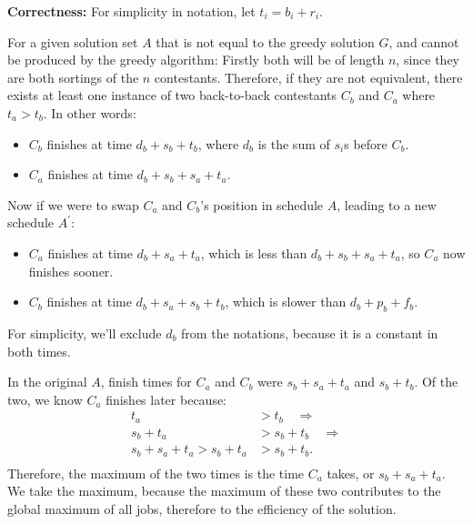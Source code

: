 \documentclass[12pt, letterpaper]{article}
\begin{document}
\noindent\textbf{Correctness:}
For simplicity in notation, let $t_i = b_i + r_i$.

\noindent For a given solution set $A$ that is not equal to the greedy solution $G$, and cannot be produced by the greedy algorithm:
Firstly both will be of length $n$, since they are both sortings of the $n$ contestants.
Therefore, if they are not equivalent, there exists at least one instance of two back-to-back contestants $C_b$ and $C_a$ where $t_a > t_b$.
In other words: 

\begin{itemize}
    \item $C_b$ finishes at time $d_b + s_b + t_b$, where $d_b$ is the sum of $s_i$s before $C_b$.
    \item $C_a$ finishes at time $d_b + s_b + s_a + t_a$.
\end{itemize}

\noindent Now if we were to swap $C_a$ and $C_b$'s position in schedule $A$, leading to a new schedule $A^{\prime}$:
\begin{itemize}
    \item $C_a$ finishes at time $d_b + s_a + t_a$, which is less than $d_b + s_b + s_a + t_a$, so $C_a$ now finishes sooner.
    \item $C_b$ finishes at time $d_b + s_a + s_b + t_b$, which is slower than $d_b + p_b + f_b$.
\end{itemize}
For simplicity, we'll exclude $d_b$ from the notations, because it is a constant in both times.

\noindent In the original $A$, finish times for $C_a$ and $C_b$ were $s_b + s_a + t_a$ and $s_b + t_b$.
Of the two, we know $C_a$ finishes later because:
\begin{align*}
    t_a &>  t_b \quad \Longrightarrow\\
    s_b + t_a &> s_b + t_b \quad \Longrightarrow\\
    s_b + s_a + t_a > s_b + t_a &> s_b + t_b .\\
\end{align*}
Therefore, the maximum of the two times is the time $C_a$ takes, or $s_b + s_a + t_a$.
We take the maximum, because the maximum of these two contributes to the global maximum of all jobs, therefore to the efficiency of the solution.
\end{document}
